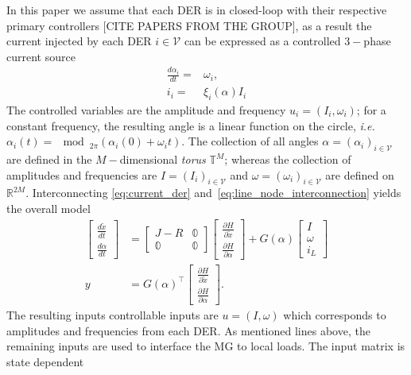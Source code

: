 \documentclass[journal, final, letterpaper]{IEEEtran}
\newcommand{\diff}[2]{{\frac{d #1}{d #2}}}
\newcommand{\pdiff}[2]{{\frac{\partial #1}{\partial #2}}}
\newcommand{\ie}{\emph{i.e.}\ }
\newcommand{\Rset}{\mathbb{R}}
\newcommand{\mc}{\mathcal}
\newcommand{\mbb}{\mathbb}
\begin{document}
In this paper we assume that each \ac{DER} is in closed-loop with their respective primary controllers [CITE PAPERS FROM THE GROUP], as a result the current injected by each \ac{DER} $i\in\mc{V}$ can be expressed as a controlled $3-$phase current source
%
\begin{subequations}
\begin{align}
  \diff{\alpha_i}{t} =& \omega_i,\label{eq:current_der_dyn}\\
  i_i = & \xi_i(\alpha)I_i 
\end{align}
\label{eq:current_der}	
\end{subequations}
% 
 The controlled variables are the amplitude and frequency $u_i = (I_i,\omega_i)$; for a constant frequency, the resulting angle is a linear function on the circle, \ie $\alpha_i(t) = \mod_{2\pi}(\alpha_i(0)+\omega_it)$. The collection of all angles $\alpha = (\alpha_i)_{i\in\mc{V}}$ are defined in the $M-$dimensional \emph{torus} $\mbb{T}^M$; whereas the collection of amplitudes and frequencies are $I = (I_i)_{i\in\mc{V}}$ and $\omega = (\omega_i)_{i\in\mc{V}}$ are defined on $\Rset^{2M}$. Interconnecting \eqref{eq:current_der} and~\eqref{eq:line_node_interconnection} yields the overall model 
%
\begin{subequations}
\begin{align}
  \begin{bmatrix}	\diff{\tilde{x}}{t}\\\diff{\alpha}{t}  \end{bmatrix} &= \begin{bmatrix} J-R & \mbb{0}\\\mbb{0} & \mbb{0}\end{bmatrix} \begin{bmatrix} \pdiff{H}{\tilde{x}}\\\pdiff{H}{\alpha}\end{bmatrix} +G(\alpha)\begin{bmatrix}I\\\omega\\ i_L\end{bmatrix}\\
  y &= G(\alpha)^\top\begin{bmatrix} \pdiff{H}{\tilde{x}}\\\pdiff{H}{\alpha}\end{bmatrix}.
\end{align}
\label{eq:MG_model}	
\end{subequations}
%
 The resulting inputs controllable inputs are $u = (I,\omega)$ which corresponds to amplitudes and frequencies from each \ac{DER}. As mentioned lines above, the remaining inputs are used to interface the \ac{MG} to local loads. The input matrix is state dependent
\end{document}
